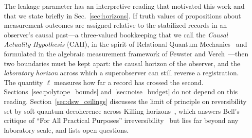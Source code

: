 The leakage parameter has an interpretive reading that motivated this work and that we state briefly in Sec.~\ref{sec:horizons}. If truth values of propositions about measurement outcomes are assigned relative to the stabilized records in an observer's causal past---a three-valued bookkeeping that we call the \emph{Causal Actuality Hypothesis} (CAH), in the spirit of Relational Quantum Mechanics~\cite{rovelli1996,smerlak2007,dibiagio2021} and formulated in the algebraic measurement framework of Fewster and Verch~\cite{fewster2020,alves2024}---then two boundaries must be kept apart: the causal horizon of the observer, and the \emph{laboratory horizon} across which a superobserver can still reverse a registration. The quantity $\ell$ measures how far a record has crossed the second. Sections~\ref{sec:polytope_bounds} and~\ref{sec:noise_budget} do not depend on this reading. Section~\ref{sec:dsw_ceilings} discusses the limit of principle on reversibility set by soft-quantum decoherence across Killing horizons~\cite{danielson2023,danielson2025}, which answers Bell's critique of ``For All Practical Purposes'' irreversibility~\cite{bell1990} but lies far beyond any laboratory scale, and lists open questions.
